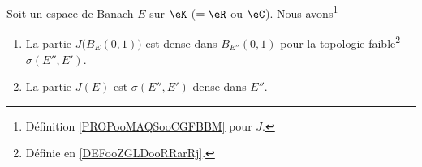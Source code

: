 \begin{theorem}	\label{THOooATSGooSZZYPz}
	Soit un espace de Banach \( E\) sur \( \eK\) (\( =\eR\) ou \( \eC\)). Nous avons\footnote{Définition \ref{PROPooMAQSooCGFBBM} pour \( J\).}
	\begin{enumerate}
		\item		\label{ITEMooMDBQooSVTyjx}
		      La partie \( J\big( B_E(0,1) \big)\) est dense dans \( B_{E''}(0,1)\) pour la topologie faible\footnote{Définie en \ref{DEFooZGLDooRRarRj}.} \( \sigma(E'',E')\).
		\item		\label{ITEMooXIGCooVpzqGA}
		      La partie \( J(E)\) est \( \sigma(E'',E')\)-dense dans \( E''\).
	\end{enumerate}
\end{theorem}

